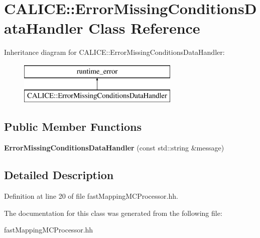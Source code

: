\section{C\-A\-L\-I\-C\-E\-:\-:Error\-Missing\-Conditions\-Data\-Handler Class Reference}
\label{classCALICE_1_1ErrorMissingConditionsDataHandler}
Inheritance diagram for C\-A\-L\-I\-C\-E\-:\-:Error\-Missing\-Conditions\-Data\-Handler\-:\begin{figure}[H]
\begin{center}
\leavevmode
\includegraphics[height=2.000000cm]{classCALICE_1_1ErrorMissingConditionsDataHandler}
\end{center}
\end{figure}
\subsection*{Public Member Functions}
\begin{DoxyCompactItemize}
\item 
{\bfseries Error\-Missing\-Conditions\-Data\-Handler} (const std\-::string \&message)\label{classCALICE_1_1ErrorMissingConditionsDataHandler_a0a85b29547427c53f0c9f5ba5b3070b0}

\end{DoxyCompactItemize}


\subsection{Detailed Description}


Definition at line 20 of file fast\-Mapping\-M\-C\-Processor.\-hh.



The documentation for this class was generated from the following file\-:\begin{DoxyCompactItemize}
\item 
fast\-Mapping\-M\-C\-Processor.\-hh\end{DoxyCompactItemize}
